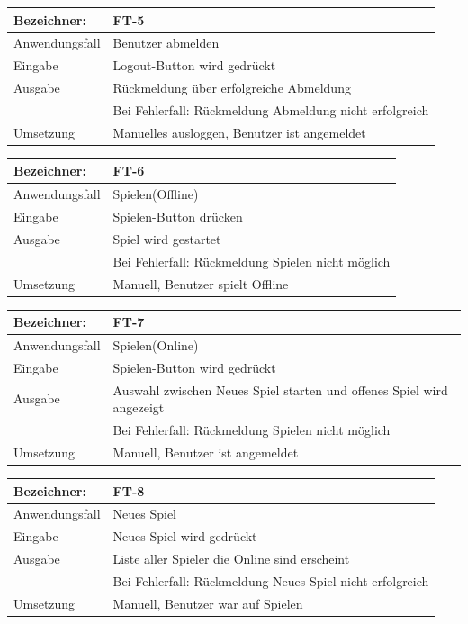 \documentclass[fontsize=12pt,paper=a4,twoside]{scrartcl}
\begin{document}
\begin{tabular}{|l|p{13.75cm}|}
\hline
	Bezeichner: & FT-5\\
\hline
	Anwendungsfall & Benutzer abmelden\\
\hline
	Eingabe & Logout-Button wird gedrückt\\
\hline
	Ausgabe & Rückmeldung über erfolgreiche Abmeldung\\ &
	Bei Fehlerfall: Rückmeldung Abmeldung nicht erfolgreich\\
\hline
	Umsetzung & Manuelles ausloggen, Benutzer ist angemeldet\\
\hline
\end{tabular}

\begin{tabular}{|l|p{13.75cm}|}
\hline
	Bezeichner: & FT-6\\
\hline
	Anwendungsfall & Spielen(Offline)\\
\hline
	Eingabe & Spielen-Button drücken\\
\hline
	Ausgabe & Spiel wird gestartet\\ &
	Bei Fehlerfall: Rückmeldung Spielen nicht möglich\\
\hline
	Umsetzung & Manuell, Benutzer spielt Offline\\
\hline
\end{tabular}

\begin{tabular}{|l|p{13.75cm}|}
\hline
	Bezeichner: & FT-7\\
\hline
	Anwendungsfall & Spielen(Online)\\
\hline
	Eingabe & Spielen-Button wird gedrückt\\
\hline
	Ausgabe & Auswahl zwischen Neues Spiel starten und offenes Spiel wird angezeigt\\ &
	Bei Fehlerfall: Rückmeldung Spielen nicht möglich\\
\hline
	Umsetzung & Manuell, Benutzer ist angemeldet\\
\hline
\end{tabular}

\begin{tabular}{|l|p{13.75cm}|}
\hline
	Bezeichner: & FT-8\\
\hline
	Anwendungsfall & Neues Spiel\\
\hline
	Eingabe & Neues Spiel wird gedrückt\\
\hline
	Ausgabe & Liste aller Spieler die Online sind erscheint\\ &
	Bei Fehlerfall: Rückmeldung Neues Spiel nicht erfolgreich\\
\hline
	Umsetzung & Manuell, Benutzer war auf Spielen\\
\hline
\end{tabular}
\end{document}

